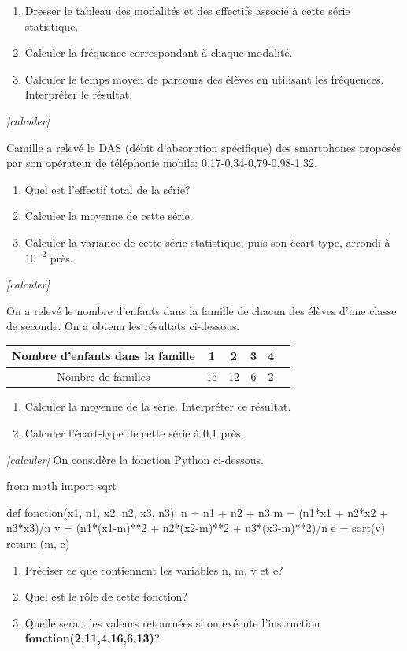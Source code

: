 \vspace{0.6cm}

\begin{enumerate}
\item Dresser le tableau des modalités et des effectifs associé à cette série statistique.

\item Calculer la fréquence correspondant à chaque modalité.

\item Calculer le temps moyen de parcours des élèves en utilisant les fréquences. Interpréter le résultat.
\end{enumerate}

\exo \textit{[calculer]}

Camille a relevé le DAS (débit d'absorption spécifique) des smartphones proposés par son opérateur de téléphonie mobile: 0,17-0,34-0,79-0,98-1,32.

\begin{enumerate}
\item Quel est l'effectif total de la série?
\item Calculer la moyenne de cette série.
\item Calculer la variance de cette série statistique, puis son écart-type, arrondi à $10^{-2}$ près.
\end{enumerate}

\exo \textit{[calculer]}

On a relevé le nombre d'enfants dans la famille de chacun des élèves d'une classe de seconde. On a obtenu les résultats ci-dessous.

\begin{center}
\begin{tabular}{*{6}{|c}|}
\hline
Nombre d'enfants dans la famille &  1 & 2 & 3&4 \tabularnewline
\hline
Nombre de familles & 15& 12 & 6 & 2 \tabularnewline
\hline
\end{tabular}
\end{center}

\begin{enumerate}
\item Calculer la moyenne de la série. Interpréter ce résultat.
\item Calculer l'écart-type de cette série à 0,1 près.
\end{enumerate}

\exo \textit{[calculer]}
On considère la fonction Python ci-dessous.

\begin{center}
\begin{minipage}{0.78\linewidth}
\begin{pythoncodenumligne}
from math import sqrt

def fonction(x1, n1, x2, n2, x3, n3):
    n = n1 + n2 + n3
    m = (n1*x1 + n2*x2 + n3*x3)/n
    v = (n1*(x1-m)**2 + n2*(x2-m)**2 + n3*(x3-m)**2)/n
    e = sqrt(v)
    return (m, e)
\end{pythoncodenumligne}
\end{minipage}
\end{center}

\begin{enumerate}
\item Préciser ce que contiennent les variables n, m, v et e?
\item Quel est le rôle de cette fonction?
\item Quelle serait les valeurs retournées si on exécute l'instruction \textbf{fonction(2,11,4,16,6,13)}?
\end{enumerate}
